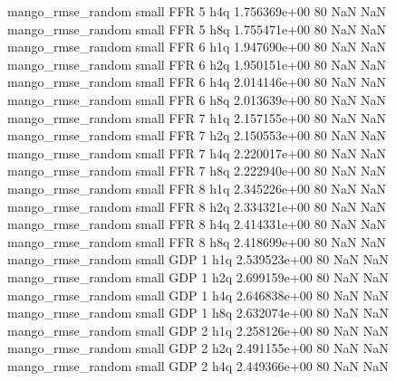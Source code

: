 mango_rmse_random      small      FFR                 5                  h4q 1.756369e+00 80            NaN                NaN
mango_rmse_random      small      FFR                 5                  h8q 1.755471e+00 80            NaN                NaN
mango_rmse_random      small      FFR                 6                  h1q 1.947690e+00 80            NaN                NaN
mango_rmse_random      small      FFR                 6                  h2q 1.950151e+00 80            NaN                NaN
mango_rmse_random      small      FFR                 6                  h4q 2.014146e+00 80            NaN                NaN
mango_rmse_random      small      FFR                 6                  h8q 2.013639e+00 80            NaN                NaN
mango_rmse_random      small      FFR                 7                  h1q 2.157155e+00 80            NaN                NaN
mango_rmse_random      small      FFR                 7                  h2q 2.150553e+00 80            NaN                NaN
mango_rmse_random      small      FFR                 7                  h4q 2.220017e+00 80            NaN                NaN
mango_rmse_random      small      FFR                 7                  h8q 2.222940e+00 80            NaN                NaN
mango_rmse_random      small      FFR                 8                  h1q 2.345226e+00 80            NaN                NaN
mango_rmse_random      small      FFR                 8                  h2q 2.334321e+00 80            NaN                NaN
mango_rmse_random      small      FFR                 8                  h4q 2.414331e+00 80            NaN                NaN
mango_rmse_random      small      FFR                 8                  h8q 2.418699e+00 80            NaN                NaN
mango_rmse_random      small      GDP                 1                  h1q 2.539523e+00 80            NaN                NaN
mango_rmse_random      small      GDP                 1                  h2q 2.699159e+00 80            NaN                NaN
mango_rmse_random      small      GDP                 1                  h4q 2.646838e+00 80            NaN                NaN
mango_rmse_random      small      GDP                 1                  h8q 2.632074e+00 80            NaN                NaN
mango_rmse_random      small      GDP                 2                  h1q 2.258126e+00 80            NaN                NaN
mango_rmse_random      small      GDP                 2                  h2q 2.491155e+00 80            NaN                NaN
mango_rmse_random      small      GDP                 2                  h4q 2.449366e+00 80            NaN                NaN
